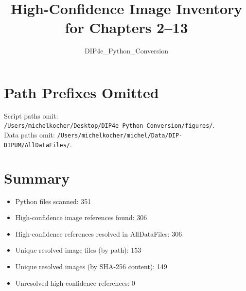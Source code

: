 \documentclass[11pt]{article}
\begin{document}
\title{High-Confidence Image Inventory for Chapters 2--13}
\author{DIP4e\_Python\_Conversion}
\date{}
\maketitle
\section*{Path Prefixes Omitted}
Script paths omit: \texttt{/Users/michelkocher/Desktop/DIP4e\_Python\_Conversion/figures/}.\\
Data paths omit: \texttt{/Users/michelkocher/michel/Data/DIP-DIPUM/AllDataFiles/}.

\section*{Summary}
\begin{itemize}
\item Python files scanned: 351
\item High-confidence image references found: 306
\item High-confidence references resolved in AllDataFiles: 306
\item Unique resolved image files (by path): 153
\item Unique resolved images (by SHA-256 content): 149
\item Unresolved high-confidence references: 0
\end{itemize}
\end{document}
